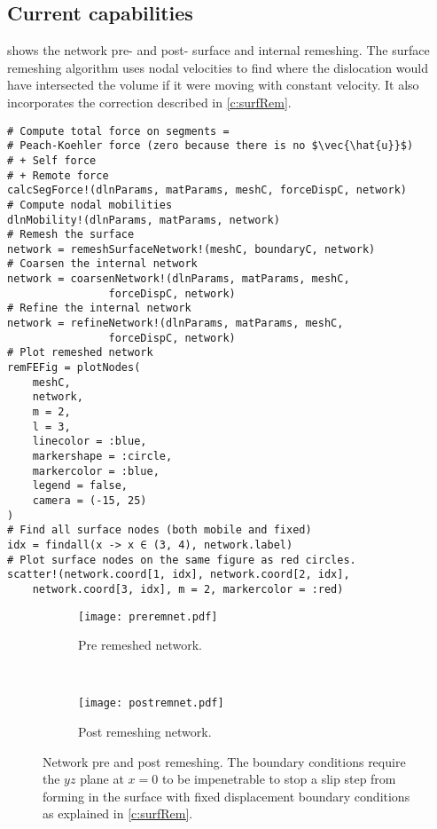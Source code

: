 \subsection{Current capabilities}

 shows the network pre- and post- surface and internal remeshing. The surface remeshing algorithm uses nodal velocities to find where the dislocation would have intersected the volume if it were moving with constant velocity. It also incorporates the correction described in \cref{c:surfRem}.
\begin{verbatim}
# Compute total force on segments = 
# Peach-Koehler force (zero because there is no $\vec{\hat{u}}$)
# + Self force
# + Remote force
calcSegForce!(dlnParams, matParams, meshC, forceDispC, network)
# Compute nodal mobilities
dlnMobility!(dlnParams, matParams, network)
# Remesh the surface
network = remeshSurfaceNetwork!(meshC, boundaryC, network)
# Coarsen the internal network
network = coarsenNetwork!(dlnParams, matParams, meshC, 
                forceDispC, network)
# Refine the internal network
network = refineNetwork!(dlnParams, matParams, meshC, 
                forceDispC, network)
# Plot remeshed network
remFEFig = plotNodes(
    meshC,
    network,
    m = 2,
    l = 3,
    linecolor = :blue,
    markershape = :circle,
    markercolor = :blue,
    legend = false,
    camera = (-15, 25)
)
# Find all surface nodes (both mobile and fixed)
idx = findall(x -> x ∈ (3, 4), network.label)
# Plot surface nodes on the same figure as red circles.
scatter!(network.coord[1, idx], network.coord[2, idx], 
    network.coord[3, idx], m = 2, markercolor = :red)
\end{verbatim}
\begin{figure}
    \centering
    \begin{subfigure}[t]{0.48\linewidth}
        \centering
        \texttt{[image: preremnet.pdf]}
        \caption{Pre remeshed network.}
    \end{subfigure}
    ~
    \begin{subfigure}[t]{0.48\linewidth}
        \centering
        \texttt{[image: postremnet.pdf]}
        \caption{Post remeshing network.}
    \end{subfigure}
    \caption[Network pre and post remeshing.]{Network pre and post remeshing. The boundary conditions require the $yz$ plane at $x=0$ to be impenetrable to stop a slip step from forming in the surface with fixed displacement boundary conditions as explained in \cref{c:surfRem}.}
    \label{f:networkPrePost}
\end{figure}

